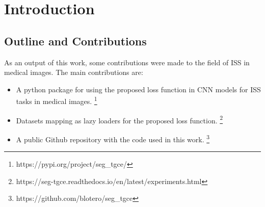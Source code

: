 \chapter{Introduction}\label{ch:introduction}







\clearpage
\section{Outline and Contributions}

As an output of this work, some contributions were made to the field of
\gls{ISS} in medical images. The main contributions are:

\begin{itemize}
  \item A python package for using the proposed loss function in
    \gls{CNN} models for \gls{ISS} tasks in medical images.
    \footnote{https://pypi.org/project/seg\_tgce/}
  \item Datasets mapping as lazy loaders for the proposed loss
    function.
    \footnote{https://seg-tgce.readthedocs.io/en/latest/experiments.html}
  \item A public Github repository with the code used in this work.
    \footnote{https://github.com/blotero/seg\_tgce}
\end{itemize}

